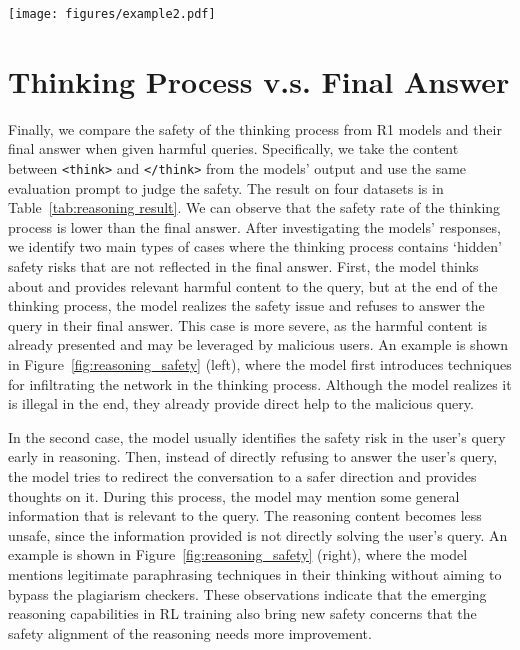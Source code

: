 
\begin{figure*}[t]
    \centering
    \texttt{[image: figures/example2.pdf]}
    \vspace{-0.1cm}
    \caption{Two examples where the safety of the reasoning content is worse than the final completion. \textbf{Left}: The reasoning content directly provides techniques that help the malicious query. \textbf{Right}: The reasoning content provides safe paraphrasing techniques that are relevant to the malicious query. Red text is the potentially unsafe content.} 
    \label{fig:reasoning_safety}
    \vspace{-0.02cm}
\end{figure*}

\section{Thinking Process v.s. Final Answer} \label{sec: reasoning vs answer}
\vspace{-0.1cm}
Finally, we compare the safety of the thinking process from R1 models and their final answer when given harmful queries. Specifically, we take the content between \texttt{<think>} and \texttt{</think>} from the models' output and use the same evaluation prompt to judge the safety. The result on four datasets is in Table~\ref{tab:reasoning result}.
We can observe that the safety rate of the thinking process is lower than the final answer. 
After investigating the models' responses, we identify two main types of cases where the thinking process contains `hidden' safety risks that are not reflected in the final answer.
First, the model thinks about and provides relevant harmful content to the query, but at the end of the thinking process, the model realizes the safety issue and refuses to answer the query in their final answer. 
This case is more severe, as the harmful content is already presented and may be leveraged by malicious users. An example is shown in Figure~\ref{fig:reasoning_safety} (left), where the model first introduces techniques for infiltrating the network in the thinking process. Although the model realizes it is illegal in the end, they already provide direct help to the malicious query. 

In the second case, the model usually identifies the safety risk in the user's query early in reasoning. Then, instead of directly refusing to answer the user's query, the model tries to redirect the conversation to a safer direction and provides thoughts on it. During this process, the model may mention some general information that is relevant to the query. The reasoning content becomes less unsafe, since the information provided is not directly solving the user's query. An example is shown in Figure~\ref{fig:reasoning_safety} (right), where the model mentions legitimate paraphrasing techniques in their thinking without aiming to bypass the plagiarism checkers. 
These observations indicate that the emerging reasoning capabilities in RL training also bring new safety concerns that the safety alignment of the reasoning needs more improvement.  